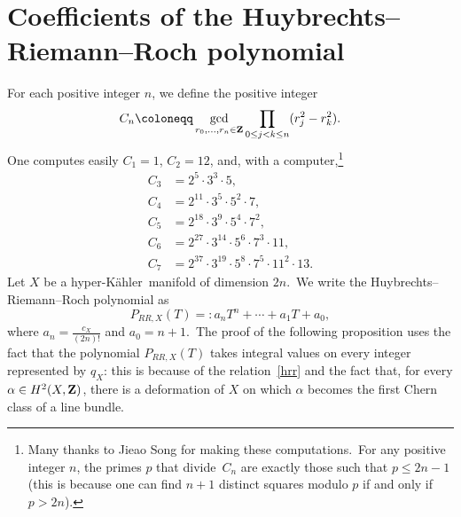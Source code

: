 \documentclass[12pt]{amsart}
\def\Z{{\bf Z}}
\DeclareMathOperator{\ch}{ch}
\def\hk{hyper-K\"ahler}
\theoremstyle{remark}
\newtheorem{rema}[lemm]{Remark}
\begin{document}
%
%
%
%




\section{Coefficients of the Huybrechts--Riemann--Roch polynomial}

For each positive integer $n$, we define the positive integer  
\[
C_n\coloneqq\gcd_{r_0,\dots,r_n\in \Z} \prod_{0\le j<k\le n}(r_j^2-r_k^2).
\]
One computes easily $C_1=1$, $C_2=12$, and, with a computer,\footnote{Many thanks to Jieao Song for making these computations.\ For any positive integer $n$, the   primes $p$ that divide~$C_n$ are exactly those such that $p\le  2n-1$ (this is because one can find $n+1$ distinct squares modulo $p$ if and only if $p>2n$).} 
\begin{align*}
C_3&=2^5\cdot 3^3\cdot 5,\\
C_4&= 2^{11} \cdot 3^5 \cdot 5^2 \cdot 7,\\
C_5&= 2^{18} \cdot 3^9 \cdot 5^4 \cdot 7^2,
\\
C_6&= 2^{27} \cdot 3^{14} \cdot 5^6 \cdot 7^3 \cdot 11,
\\
C_7&= 2^{37} \cdot 3^{19} \cdot 5^8 \cdot 7^5\cdot 11^2\cdot 13.
\end{align*}
Let $X$ be a \hk\ manifold of dimension $2n$.\  We write the Huybrechts--Riemann--Roch polynomial as
   \begin{equation*}%
 P_{RR,X}(T) =:a_nT^n+\cdots +a_1T+a_0,
 \end{equation*}
 where $a_n= \frac{c_X}{(2n)!}$ and $a_0=n+1$.\ The proof of the following proposition uses the fact that the polynomial $ P_{RR,X}(T)$ takes integral values on every integer represented by $q_X$: this is because of the relation~\eqref{hrr} and the fact that, for every $\alpha\in H^2(X,\Z)$, there is a deformation of $X$ on which $\alpha$ becomes the first Chern class of a line bundle.
\end{document}
